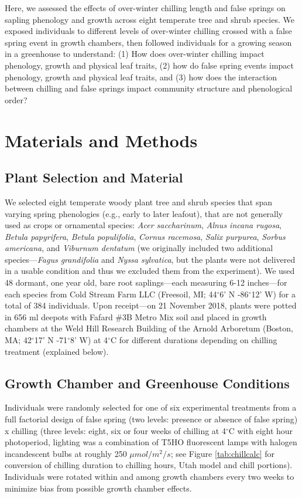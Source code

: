 \documentclass{article}\usepackage[]{graphicx}\usepackage[]{color}
\begin{document}
\begin{enumerate}
Here, we assessed the effects of over-winter chilling length and false springs on sapling phenology and growth across eight temperate tree and shrub species. We exposed individuals to different levels of over-winter chilling crossed with a false spring event in growth chambers, then followed individuals for a growing season in a greenhouse to understand: (1) How does over-winter chilling impact phenology, growth and physical leaf traits, (2) how do false spring events impact phenology, growth and physical leaf traits, and (3) how does the interaction between chilling and false springs impact community structure and phenological order?

\section*{Materials and Methods} 
\subsection*{Plant Selection and Material}
We selected eight temperate woody plant tree and shrub species that span varying spring phenologies (e.g., early to later leafout), that are not generally used as crops or ornamental species: \textit{Acer saccharinum}, \textit{Alnus incana rugosa}, \textit{Betula papyrifera}, \textit{Betula populifolia}, \textit{Cornus racemosa}, \textit{Salix purpurea}, \textit{Sorbus americana}, and \textit{Viburnum dentatum} (we originally included two additional species---\textit{Fagus grandifolia} and \textit{Nyssa sylvatica}, but the plants were not delivered in a usable condition and thus we excluded them from the experiment). We used 48 dormant, one year old, bare root saplings---each measuring 6-12 inches---for each species from Cold Stream Farm LLC (Freesoil, MI; 44$^{\circ}$6' N -86$^{\circ}$12' W) for a total of 384 individuals. Upon receipt---on 21 November 2018, plants were potted in 656 ml deepots with Fafard \#3B Metro Mix soil and placed in growth chambers at the Weld Hill Research Building of the Arnold Arboretum (Boston, MA; 42$^{\circ}$17' N -71$^{\circ}$8' W) at 4$^{\circ}$C for different durations depending on chilling treatment (explained below).   

\subsection*{Growth Chamber and Greenhouse Conditions}
Individuals were randomly selected for one of six experimental treatments from a full factorial design of false spring (two levels: presence or absence of false spring) x chilling (three levels: eight, six or four weeks of chilling at 4$^{\circ}$C with eight hour photoperiod, lighting was a combination of T5HO fluorescent lamps with halogen incandescent bulbs at roughly 250 $\mu mol/m^{2}/s$; see Figure \ref{tab:chillcalc} for conversion of chilling duration to chilling hours, Utah model and chill portions). Individuals were rotated within and among growth chambers every two weeks to minimize bias from possible growth chamber effects. %


\end{enumerate}
\end{document}
